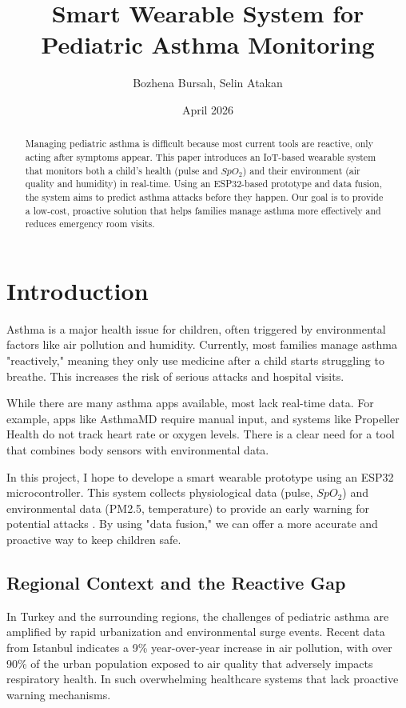 \documentclass[two column]{article}
\title{Smart Wearable System for Pediatric Asthma Monitoring}
\author{Bozhena Bursalı, Selin Atakan}
\date{April 2026}
\begin{document}
\maketitle
\begin{abstract}
Managing pediatric asthma is difficult because most current tools are reactive, only acting after symptoms appear. This paper introduces an IoT-based wearable system that monitors both a child's health (pulse and $SpO_2$) and their environment (air quality and humidity) in real-time. Using an ESP32-based prototype and data fusion, the system aims to predict asthma attacks before they happen. Our goal is to provide a low-cost, proactive solution that helps families manage asthma more effectively and reduces emergency room visits.
\end{abstract}

\section{Introduction}
Asthma is a major health issue for children, often triggered by environmental factors like air pollution and humidity\cite{Pubmed2026}. Currently, most families manage asthma "reactively," meaning they only use medicine after a child starts struggling to breathe. This increases the risk of serious attacks and hospital visits.

While there are many asthma apps available, most lack real-time data. For example, apps like AsthmaMD require manual input, and systems like Propeller Health do not track heart rate or oxygen levels. There is a clear need for a tool that combines body sensors with environmental data.

In this project, I hope to develope a smart wearable prototype using an ESP32 microcontroller\cite{Li2018}. This system collects physiological data (pulse, $SpO_2$) and environmental data (PM2.5, temperature) to provide an early warning for potential attacks \cite{Pubmed2026}. By using "data fusion," we can offer a more accurate and proactive way to keep children safe.\cite{WHO}

\subsection{Regional Context and the Reactive Gap}
In Turkey and the surrounding regions, the challenges of pediatric asthma are amplified by rapid urbanization and environmental surge events. Recent data from Istanbul indicates a 9\% year-over-year increase in air pollution, with over 90\% of the urban population exposed to air quality that adversely impacts respiratory health. In such overwhelming healthcare systems that lack proactive warning mechanisms.\cite{IstanbulPollution2026}
\end{document}

